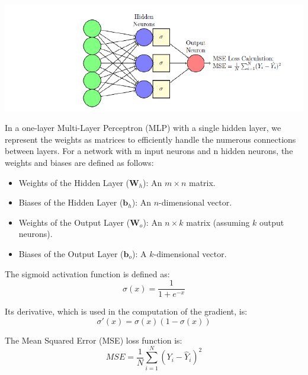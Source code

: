 \documentclass{article}
\begin{document}
\begin{center}
    \includegraphics[scale=0.5]{nn1.png}
\end{center}
In a one-layer Multi-Layer Perceptron (MLP) with a single hidden layer, we represent the weights as matrices
to efficiently handle the numerous connections between layers. For a network with m input neurons and n
hidden neurons, the weights and biases are defined as follows:
\begin{itemize}
    \item Weights of the Hidden Layer ($\mathbf{W}_h$): An $m \times n$ matrix.
    \item Biases of the Hidden Layer ($\mathbf{b}_h$): An $n$-dimensional vector.
    \item Weights of the Output Layer ($\mathbf{W}_o$): An $n \times k$ matrix (assuming $k$ output neurons).
    \item Biases of the Output Layer ($\mathbf{b}_o$): A $k$-dimensional vector.
\end{itemize}

The sigmoid activation function is defined as:
\[
\sigma(x) = \frac{1}{1 + e^{-x}}
\]

Its derivative, which is used in the computation of the gradient, is:
\[
\sigma'(x) = \sigma(x)(1 - \sigma(x))
\]

The Mean Squared Error (MSE) loss function is:
\[
MSE = \frac{1}{N} \sum_{i=1}^{N} (Y_i - \hat{Y}_i)^2
\]
\end{document}
